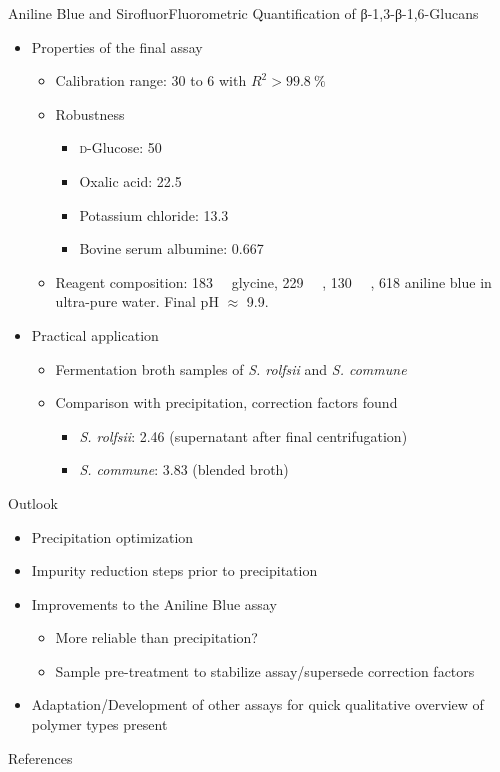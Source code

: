 \documentclass[mathserif]{beamer}
\newcommand{\SIpct}[1]{\SI{#1}{\percent}} %
\newcommand{\SImM}[1]{\SI{#1}{\milli\M}} %
\newcommand{\SIgpl}[1]{\SI{#1}{\gpl}} %
\newcommand{\SImgpl}[1]{\SI{#1}{\mgpl}} %
\newcommand{\mo}[1]{\emph{#1}} %
\newcommand{\rolf}{\mo{S. rolfsii}}
\newcommand{\comm}{\mo{S. commune}}
\newcommand{\GLC}{\textsc{d}-Glu\-cose}
\begin{document}
\begin{frame}{Aniline Blue and Sirofluor}{Fluorometric Quantification of β-1,3-β-1,6-Glucans \cite{Koenig2017}}
	\begin{itemize}
		\item Properties of the final assay
			\begin{itemize}
				\item Calibration range: \SImgpl{30} to \SIgpl{6} with $R^2 > \SIpct{99.8}$
				\pause
				\item Robustness
					\begin{itemize}
						\item \GLC{}: \SIgpl{50}
						\item Oxalic acid: \SIgpl{22.5}
						\item Potassium chloride: \SIgpl{13.3}
						\item Bovine serum albumine: \SIgpl{0.667}
					\end{itemize}
				\pause
				\item Reagent composition: \SImM{183} glycine, \SImM{229} , \SImM{130} , \SImgpl{618} aniline blue in ultra-pure water. Final pH $\approx$ 9.9.
			\end{itemize}
		\pause
		\item Practical application
			\begin{itemize}
				\item Fermentation broth samples of \rolf{} and \comm{}
				\pause
				\item Comparison with precipitation, correction factors found
				\pause
					\begin{itemize}
						\item \rolf{}: 2.46 (supernatant after final centrifugation)
						\item \comm{}: 3.83 (blended broth)
					\end{itemize}
			\end{itemize}
	\end{itemize}
\end{frame}

\begin{frame}{Outlook}{}
	\begin{itemize}
		\item Precipitation optimization
		\pause
		\item Impurity reduction steps prior to precipitation
		\pause
		\item Improvements to the Aniline Blue assay
		\begin{itemize}
			\item More reliable than precipitation?
			\pause
			\item Sample pre-treatment to stabilize assay/supersede correction factors
		\end{itemize}
		\pause
		\item Adaptation/Development of other assays for quick qualitative overview of polymer types present
	\end{itemize}
\end{frame}

\begin{frame}[allowframebreaks]{References}{}
	\printbibliography
\end{frame}
\end{document}
